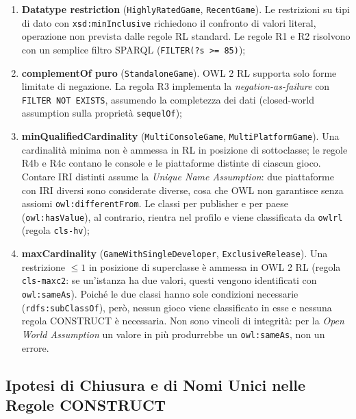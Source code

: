 \begin{enumerate}[nosep]
  \item \textbf{Datatype restriction} (\texttt{HighlyRatedGame}, \texttt{RecentGame}).
    Le restrizioni su tipi di dato con \texttt{xsd:minInclusive} richiedono il
    confronto di valori literal, operazione non prevista dalle regole RL standard.
    Le regole R1 e R2 risolvono con un semplice filtro SPARQL (\texttt{FILTER(?s >= 85)});
  \item \textbf{complementOf puro} (\texttt{StandaloneGame}). OWL 2 RL supporta
    solo forme limitate di negazione. La regola R3 implementa la
    \textit{negation-as-failure} con \texttt{FILTER NOT EXISTS}, assumendo la
    completezza dei dati (closed-world assumption sulla propriet\`a \texttt{sequelOf});
  \item \textbf{minQualifiedCardinality} (\texttt{MultiConsoleGame}, \texttt{MultiPlatformGame}). Una cardinalit\`a minima non \`e ammessa
    in RL in posizione di sottoclasse; le regole R4b e R4c contano le console e le piattaforme distinte di ciascun gioco. Contare IRI distinti assume la
    \textit{Unique Name Assumption}: due piattaforme con IRI diversi sono considerate diverse, cosa che OWL non garantisce senza assiomi \texttt{owl:differentFrom}.
    Le classi per publisher e per paese (\texttt{owl:hasValue}), al contrario, rientra nel
    profilo e viene classificata da \texttt{owlrl} (regola \texttt{cls-hv});
  \item \textbf{maxCardinality} (\texttt{GameWithSingleDeveloper}, \texttt{ExclusiveRelease}).
    Una restrizione ${\le}1$ in posizione di superclasse \`e ammessa in OWL 2 RL
    (regola \texttt{cls-maxc2}: se un'istanza ha due valori, questi vengono identificati
    con \texttt{owl:sameAs}). Poich\'e le due classi hanno sole condizioni necessarie
    (\texttt{rdfs:subClassOf}), per\`o, nessun gioco viene classificato in esse e nessuna
    regola CONSTRUCT \`e necessaria. Non sono vincoli di integrit\`a: per la \textit{Open World Assumption}
    un valore in pi\`u produrrebbe un \texttt{owl:sameAs}, non un errore.
\end{enumerate}

\subsection{Ipotesi di Chiusura e di Nomi Unici nelle Regole CONSTRUCT}


